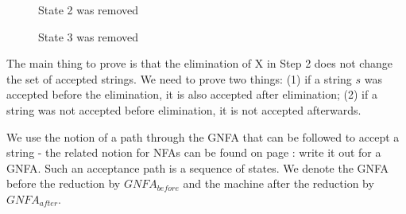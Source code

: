 \begin{figure}[h]
\caption{State 2 was removed \label{gfsa2}}
\end{figure}

\begin{figure}[h]
\caption{State 3 was removed \label{gfsa3}}
\end{figure}


The main thing to prove is that the elimination of X in
Step 2 does not change the set of accepted strings. We need to prove
two things: (1) if a string $s$ was accepted before the elimination,
it is also accepted after elimination; (2) if a string was not accepted
before elimination, it is not accepted afterwards.



We use the notion of a path through the GNFA that can be followed to
accept a string - the related notion for NFAs can be found on page
\pageref{defacceptnfa}: write it out for a GNFA. Such an acceptance
path is a sequence of states. We denote the GNFA before the reduction
by $GNFA_{before}$ and the machine after the reduction by
$GNFA_{after}$.

